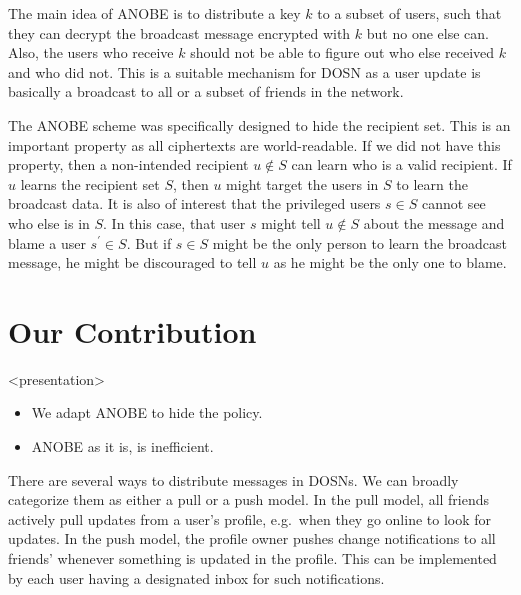 The main idea of \ac{ANOBE} is to distribute a key \(k\) to a subset of users, 
such that they can decrypt the broadcast message encrypted with \(k\) but no 
one else can.
Also, the users who receive \(k\) should not be able to figure out who else 
received \(k\) and who did not.
This is a suitable mechanism for \ac{DOSN} as a user update is basically 
a broadcast to all or a subset of friends in the network.

The \ac{ANOBE} scheme was specifically designed to hide the recipient set.
This is an important property as all ciphertexts are world-readable.
If we did not have this property, then a non-intended recipient \(u\notin S\) 
can learn who is a valid recipient.
If \(u\) learns the recipient set \(S\), then \(u\) might target the users in 
\(S\) to learn the broadcast data.
It is also of interest that the privileged users \(s\in S\) cannot see who else 
is in \(S\).
In this case, that user \(s\) might tell \(u\notin S\) about the message and 
blame a user \(s^\prime\in S\).
But if \(s\in S\) might be the only person to learn the broadcast message, he 
might be discouraged to tell \(u\) as he might be the only one to blame.


\section{Our Contribution}\label{sec:Contribution}


\begin{frame}<presentation>
  \begin{itemize}

    \item We adapt \ac{ANOBE} to hide the policy.

    \item \ac{ANOBE} as it is, is inefficient.

  \end{itemize}
\end{frame}

There are several ways to distribute messages in \acp{DOSN}.
We can broadly categorize them as either a pull or a push model.
In the pull model, all friends actively pull updates from a user's profile, 
e.g.~when they go online to look for updates.
In the push model, the profile owner pushes change notifications to all 
friends' whenever something is updated in the profile.
This can be implemented by each user having a designated inbox for such 
notifications.

